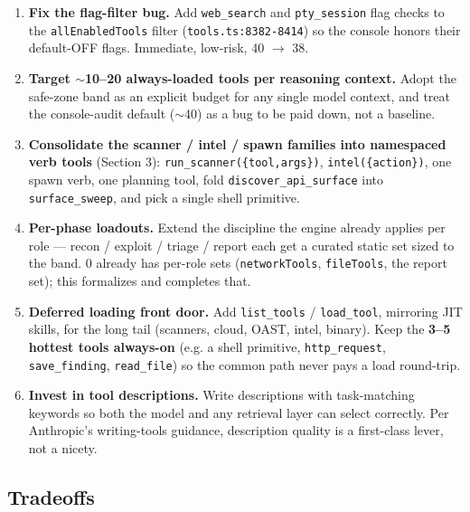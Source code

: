 \documentclass[11pt]{article}
\begin{document}
\begin{enumerate}[leftmargin=*]
  \item \textbf{Fix the flag-filter bug.} Add \texttt{web\_search} and
  \texttt{pty\_session} flag checks to the \texttt{allEnabledTools} filter
  (\texttt{tools.ts:8382-8414}) so the console honors their default-OFF flags.
  Immediate, low-risk, 40 $\rightarrow$ 38.
  \item \textbf{Target $\sim$10--20 always-loaded tools per reasoning context.}
  Adopt the safe-zone band as an explicit budget for any single model context,
  and treat the console-audit default ($\sim$40) as a bug to be paid down, not a
  baseline.
  \item \textbf{Consolidate the scanner / intel / spawn families into namespaced
  verb tools} (Section 3): \texttt{run\_scanner(\{tool,args\})},
  \texttt{intel(\{action\})}, one spawn verb, one planning tool, fold
  \texttt{discover\_api\_surface} into \texttt{surface\_sweep}, and pick a single
  shell primitive.
  \item \textbf{Per-phase loadouts.} Extend the discipline the engine already
  applies per role --- recon / exploit / triage / report each get a curated
  static set sized to the band. 0 already has per-role sets
  (\texttt{networkTools}, \texttt{fileTools}, the report set); this formalizes and
  completes that.
  \item \textbf{Deferred loading front door.} Add \texttt{list\_tools} /
  \texttt{load\_tool}, mirroring JIT skills, for the long tail (scanners, cloud,
  OAST, intel, binary). Keep the \textbf{3--5 hottest tools always-on} (e.g. a
  shell primitive, \texttt{http\_request}, \texttt{save\_finding},
  \texttt{read\_file}) so the common path never pays a load round-trip.
  \item \textbf{Invest in tool descriptions.} Write descriptions with
  task-matching keywords so both the model and any retrieval layer can select
  correctly. Per Anthropic's writing-tools guidance, description quality is a
  first-class lever, not a nicety.
\end{enumerate}

\subsection{Tradeoffs}
\end{document}
